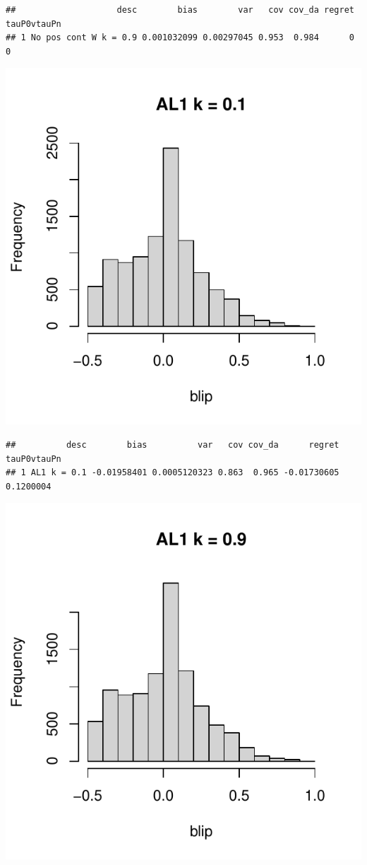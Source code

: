 \documentclass[11pt]{article}\usepackage[]{graphicx}\usepackage[table]{xcolor}
\makeatletter
\def\maxwidth{ %
  \ifdim\Gin@nat@width>\linewidth
    \linewidth
  \else
    \Gin@nat@width
  \fi
}
\newenvironment{kframe}{%
 \def\at@end@of@kframe{}%
 \ifinner\ifhmode%
  \def\at@end@of@kframe{\end{minipage}}%
  \begin{minipage}{\columnwidth}%
 \fi\fi%
 \def\FrameCommand##1{\hskip\@totalleftmargin \hskip-\fboxsep
 \colorbox{shadecolor}{##1}\hskip-\fboxsep
     \hskip-\linewidth \hskip-\@totalleftmargin \hskip\columnwidth}%
 \MakeFramed {\advance\hsize-\width
   \@totalleftmargin\z@ \linewidth\hsize
   \@setminipage}}%
 {\par\unskip\endMakeFramed%
 \at@end@of@kframe}
\newenvironment{knitrout}{}{} %
\makeatother
\begin{document}
\begin{knitrout}
\begin{kframe}\begin{verbatim}
##                    desc        bias        var   cov cov_da regret tauP0vtauPn
## 1 No pos cont W k = 0.9 0.001032099 0.00297045 0.953  0.984      0           0
\end{verbatim}
\end{kframe}
\includegraphics[width=\maxwidth]{figure/unnamed-chunk-4-13} 
\begin{kframe}\begin{verbatim}
##          desc        bias          var   cov cov_da      regret tauP0vtauPn
## 1 AL1 k = 0.1 -0.01958401 0.0005120323 0.863  0.965 -0.01730605   0.1200004
\end{verbatim}
\end{kframe}
\includegraphics[width=\maxwidth]{figure/unnamed-chunk-4-14} 

\end{knitrout}
\end{document}

